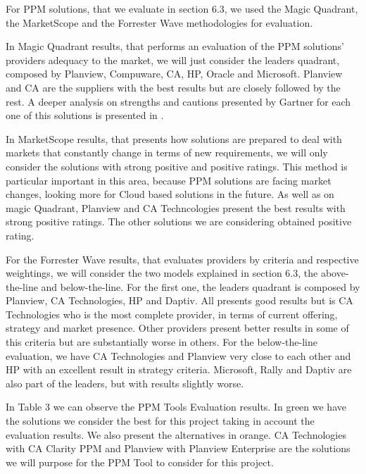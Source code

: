 For PPM solutions, that we evaluate in section 6.3, we used the Magic Quadrant, the MarketScope and the Forrester Wave methodologies for evaluation.\par
In Magic Quadrant results, that performs an evaluation of the PPM solutions' providers adequacy to the market, we will just consider the leaders quadrant, composed by Planview, Compuware, CA, HP, Oracle and Microsoft. Planview and CA are the suppliers with the best results but are closely followed by the rest. A deeper analysis on strengths and cautions presented by Gartner for each one of this solutions is presented in \cite{magicQuadrantPPM}.\par
In MarketScope results, that presents how solutions are prepared to deal with markets that constantly change in terms of new requirements, we will only consider the solutions with strong positive and positive ratings. This method is particular important in this area, because PPM solutions are facing market changes, looking more for Cloud based solutions in the future. As well as on magic Quadrant, Planview and CA Techncologies present the best results with strong positive ratings. The other solutions we are considering obtained positive rating.\par
For the Forrester Wave results, that evaluates providers by criteria and respective weightings, we will consider the two models explained in section 6.3, the above-the-line and below-the-line. For the first one, the leaders quadrant is composed by Planview, CA Technologies, HP and Daptiv. All presents good results but is CA Technologies who is the most complete provider, in terms of current offering, strategy and market presence. Other providers present better results in some of this criteria but are substantially worse in others. For the below-the-line evaluation, we have CA Technologies and Planview very close to each other and HP with an excellent result in strategy criteria. Microsoft, Rally and Daptiv are also part of the leaders, but with results slightly worse.\par
In Table 3 we can observe the PPM Tools Evaluation results. In green we have the solutions we consider the best for this project taking in account the evaluation results. We also present the alternatives in orange. CA Technologies with CA Clarity PPM and Planview with Planview Enterprise are the solutions we will purpose for the PPM Tool to consider for this project.



